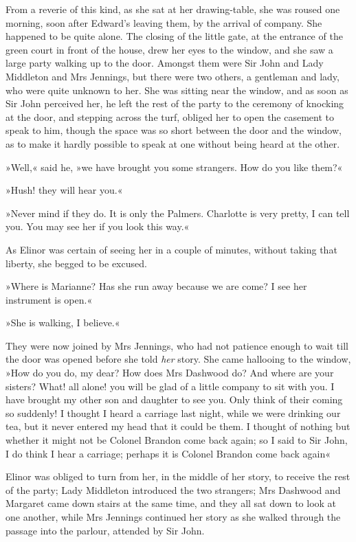 From a reverie of this kind, as she sat at her drawing-table, she was roused one morning, soon after Edward’s leaving them, by the arrival of company. She happened to be quite alone. The closing of the little gate, at the entrance of the green court in front of the house, drew her eyes to the window, and she saw a large party walking up to the door. Amongst them were Sir John and Lady Middleton and Mrs Jennings, but there were two others, a gentleman and lady, who were quite unknown to her. She was sitting near the window, and as soon as Sir John perceived her, he left the rest of the party to the ceremony of knocking at the door, and stepping across the turf, obliged her to open the casement to speak to him, though the space was so short between the door and the window, as to make it hardly possible to speak at one without being heard at the other.

»Well,« said he, »we have brought you some strangers. How do you like them?«

»Hush! they will hear you.«

»Never mind if they do. It is only the Palmers. Charlotte is very pretty, I can tell you. You may see her if you look this way.«

As Elinor was certain of seeing her in a couple of minutes, without taking that liberty, she begged to be excused.

»Where is Marianne? Has she run away because we are come? I see her instrument is open.«

»She is walking, I believe.«

They were now joined by Mrs Jennings, who had not patience enough to wait till the door was opened before she told \textit{her} story. She came hallooing to the window, »How do you do, my dear? How does Mrs Dashwood do? And where are your sisters? What! all alone! you will be glad of a little company to sit with you. I have brought my other son and daughter to see you. Only think of their coming so suddenly! I thought I heard a carriage last night, while we were drinking our tea, but it never entered my head that it could be them. I thought of nothing but whether it might not be Colonel Brandon come back again; so I said to Sir John, I do think I hear a carriage; perhaps it is Colonel Brandon come back again\longdash«

Elinor was obliged to turn from her, in the middle of her story, to receive the rest of the party; Lady Middleton introduced the two strangers; Mrs Dashwood and Margaret came down stairs at the same time, and they all sat down to look at one another, while Mrs Jennings continued her story as she walked through the passage into the parlour, attended by Sir John.

